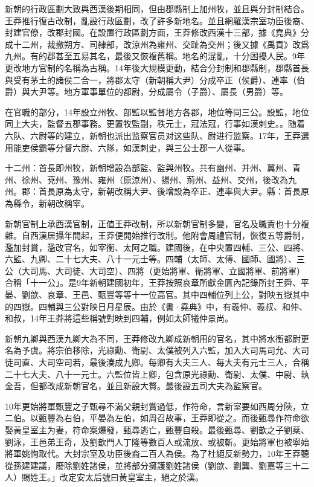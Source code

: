 新朝的行政區劃大致與西漢後期相同，但由郡縣制上加州牧，並且與分封制結合。王莽推行復古改制，亂設行政區劃，改了許多新地名。並且網羅漢宗室功臣後裔、封建官僚，改郡封國。在設置行政區劃方面，王莽修改西漢十三部，據《堯典》分成十二州，裁撤朔方、司隸部，改涼州為雍州、交趾為交州；後又據《禹貢》改爲九州。有的郡甚至五易其名，最後又恢複舊稱。地名的混亂，十分困擾人民。9年更改地方官制的名稱為古稱。14年後大規模更動，結合分封制和郡縣制，郡縣首長與受有茅土的諸侯二合一，將郡太守（新朝稱大尹）分成卒正（侯爵）、連率（伯爵）與大尹等。地方軍事單位的都尉，分成屬令（子爵）、屬長（男爵）等。

在官職的部分，14年設立州牧、部監以監督地方各郡，地位等同三公。設監，地位同上大夫，監督五郡事務。更置牧監副，秩元士，冠法冠，行事如漢刺史。。随着六队、六尉等的建立，新朝也派出监察官员对这些队、尉进行监察。17年，王莽選用能吏侯霸等分督六尉、六隊，如漢刺史，與三公士郡一人從事。

十二州：首長即州牧，新朝增設為部監、監與州牧。共有幽州、并州、冀州、青州、徐州、兗州、豫州、雍州（原涼州）、揚州、荊州、益州、交州，後改為九州。郡：首長原為太守，新朝改稱大尹、後增設為卒正、連率與大尹。縣：首長原為縣令，新朝改稱宰。

新朝官制上承西漢官制，正值王莽改制，所以新朝官制多變，官名及職責也十分複雜。自西漢居攝年間起，王莽便開始推行改制。他附會周禮官制，恢復五等爵制，濫加封賞，濫改官名，如宰衡、太阿之職。建國後，在中央置四輔、三公、四將、六監、九卿、二十七大夫、八十一元士等。四輔（太師、太傅、國師、國將）、三公（大司馬、大司徒、大司空）、四將（更始將軍、衛將軍、立國將軍、前將軍）合稱「十一公」。是9年新朝建國初年，王莽按照哀章所獻金匱內記錄所封王舜、平晏、劉歆、哀章、王邑、甄豐等等十一位高官。其中四輔位列上公，對映五嶽其中的四嶽。四輔與三公對映日月星辰。由於《書·堯典》中，有羲仲、羲叔、和仲、和叔，14年王莽將這些稱號對映到四輔，例如太師犧仲景尚。

新朝九卿與西漢九卿大為不同，王莽修改九卿成新朝用的官名，其中將水衡都尉更名為予虞。將宗伯移除，光祿勳、衛尉、太僕被列入六監，加入大司馬司允、大司徒司直、大司空司若，最後湊成九卿。每卿有大夫三人、每大夫有元士三人，合稱二十七大夫、八十一元士。六監位皆上卿，包含原光祿勳、衛尉、太僕、中尉、執金吾，但都改成新朝官名，並且新設大贅。最後設五司大夫為監察官。

10年更始將軍甄豐之子甄尋不滿父親封賞過低，作符命，言新室要如西周分陝，立二伯。以甄豐為右伯，平晏為左伯，如周召故事，王莽即從之。而後甄尋作符命欲娶黃皇室主为妻，符命案爆發，甄尋逃亡，甄豐自殺。最後甄尋、劉歆之子劉棻、劉泳，王邑弟王奇，及劉歆門人丁隆等數百人或流放、或被斬。更始將軍也被寧始將軍姚恂取代。大封宗室及功臣後裔二百人為侯。為了杜絕反新勢力，10年王莽聽從孫建建議，廢除劉姓諸侯，並將部分擁護劉姓諸侯（劉歆、劉龔、劉嘉等三十二人）賜姓王。」改定安太后號曰黃皇室主，絕之於漢。

